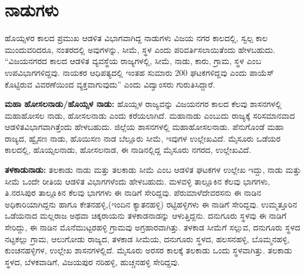 \section{ನಾಡುಗಳು}

ಹೊಯ್ಸಳರ ಕಾಲದ ಪ್ರಮುಖ ಆಡಳಿತ ವಿಭಾಗವಾಗಿದ್ದ ನಾಡುಗಳು ವಿಜಯ ನಗರ ಕಾಲದಲ್ಲಿ, ಸ್ವಲ್ಪ ಕಾಲ ಮುಂದುವರಿದರೂ, ನಂತರದಲ್ಲಿ ಅವುಗಳನ್ನು, ಸೀಮೆ, ಸ್ಥಳ ಎಂದು ಪರಿವರ್ತಿಸಲಾಯಿತೆಂದು ಹೇಳಬಹುದು. “ವಿಜಯನಗರದ ಕಾಲದ ಆಡಳಿತ ವ್ಯವಸ್ಥೆಯ ರಾಜ್ಯಗಳಲ್ಲಿ, ಸೀಮೆ, ನಾಡು, ಕಾರು, ಗ್ರಾಮ, ಸ್ಥಳ ಎಂಬ ಉಪವಿಭಾಗಗಳಿದ್ದವು. ನಾಯಕರ ಆಧಿಪತ್ಯದಲ್ಲಿ ಇಂತಹ ಸುಮಾರು 200 ಘಟಕಗಳಿದ್ದವು ಎಂದು ಪಾಯೆಸ್​ ಕೊಟ್ಟಿರುವ ವಿವರಣೆಯಿಂದ ವ್ಯಕ್ತವಾಗುವುದು” ಎಂದು ವಿದ್ವಾಂಸರು ಗುರುತಿಸಿದ್ದಾರೆ.

\textbf{ಮಹಾ ಹೋಸಲನಾಡು/ಹೊಯ್ಸಳ ನಾಡು:} ಹೊಯ್ಸಳ ರಾಜ್ಯವನ್ನು ವಿಜಯನಗರ ಕಾಲದ ಕೆಲವು ಶಾಸನಗಳಲ್ಲಿ ಮಹಾಹೋಸಲ ನಾಡು, ಹೋಸಲನಾಡು ಎಂದು ಕರೆಯಲಾಗಿದೆ. ಮಹಾನಾಡು ಎಂಬುದು ರಾಜ್ಯಕ್ಕೆ ಸರಿಸಮಾನವಾದ ಆಡಳಿತವಿಭಾಗವಾಗಿತ್ತೆಂದು ಹೇಳಬಹುದು. ಜಿಲ್ಲೆಯ ಶಾಸನಗಳಲ್ಲಿ ಮಹಾಹೋಸಲನಾಡು. ಪೆನುಗೊಂಡೆ ಮಹಾ ರಾಜ್ಯದ, ಹ್ವೈಸಣ ನಾಡು, ಹೊಯಿಸಣ ನಾಡ ಬೆಲ್ಲೂರು ಸೀಮೆ, ಇವುಗಳ ಉಲ್ಲೇಖವಿದೆ. ಮೈಸೂರು ಒಡೆಯರ ಕಾಲದಲ್ಲಿ, ಹೊಯ್ಸಲನಾಡು, ಹೋಸಲನಾಡ, ಈ ನಾಡಿನಲ್ಲಿದ್ದ ಮೈಸೂರು ನಗರದ, ಉಲ್ಲೇಖವಿದೆ.

\textbf{ತಳಕಾಡುನಾಡು:} ತಲಕಾಡು ನಾಡು ಮತ್ತು ತಲಕಾಡು ಸೀಮೆ ಎಂಬ ಆಡಳಿತ ಘಟಕಗಳ ಉಲ್ಲೇಖ ಇದ್ದು, ನಾಡು ಮತ್ತು ಸೀಮೆ ಒಂದೇ ರೀತಿಯ ಆಡಳಿತ ವಿಭಾಗಗಳೆಂದು ಹೇಳಬಹುದು. ಮಳವಳ್ಳಿ ತಾಲ್ಲೂಕಿನ ಕೆಲವು ಭಾಗಗಳು, ತಿ.ನರಸಿಪುರ ತಾಲ್ಲೂಕಿನ ಕೆಲವು ಭಾಗಗಳು ಈ ನಾಡಿಗೆ ಸೇರಿದ್ದವು. ಪೆರುಮಾಳೆದೇವರಸನು ಈ ನಾಡಿನ ಅಧಿಕಾರಿಯಾಗಿದ್ದನು ಹಾಗೂ ಕೇತನಹಳ್ಳಿ,(ಇಂದಿನ ಕ್ಯಾತನಹಳ್ಳಿ) ರಟ್ಟಿಹಳ್ಳಿಗಳು ಈ ನಾಡಿಗೆ ಸೇರಿದ್ದವು. ಉಮ್ಮತ್ತೂರಿನ ಒಡೆಯನಾದ ಮಲ್ಲರಾಜ ಅಥವಾ ಚಿಕ್ಕರಾಯನು ತಳಕಾಡನಾಡನ್ನು ಆಳುತ್ತಿದ್ದನು. ದನುಗೂರು ಸ್ಥಳವು ಈ ನಾಡಿಗೆ ಸೇರಿದ್ದು, ಈ ನಾಡಿನ ಮೊನೆಮುಟ್ಟರಹಳ್ಳಿ ಗ್ರಾಮವು ಅಗ್ರಹಾರವಾಗಿತ್ತು. ತಳಕಾಡ ಸೀಮೆಗೆ ಸಲ್ಲುವ, ದನುಗೂರು ಸ್ಥಳದ ನಟ್ಟಕಲ್ಲು ಗ್ರಾಮ, ಆಲುಗೋಡು ರಾಜ್ಯದ, ತಳಕಾಡ ಸೀಮೆಯ, ದನುಗೂರು ಸ್ಥಳದ, ಹಲಸನಹಳ್ಳಿ, ಬೊಮ್ಮನಹಳ್ಳಿ, ಕುಂಚನಹಳ್ಳಿಗಳ, ಉಲ್ಲೇಖ ಶಾಸನಗಳಲ್ಲಿದೆ. ಮೈಸೂರು ಅರಸರ ಕಾಲಕ್ಕೆ ತಲಕಾಡು ಒಂದು ಸ್ಥಳವಾಗಿತ್ತು. ತಲಕಾಡು ಸ್ಥಳದ, ಬೆಳಕವಾಡಿಗೆ, ವಿಜಯಪುರ ನರಿಹಳ್ಳಿ, ಹುಚ್ಚನಹಳ್ಳಿ ಸೇರಿದ್ದವು.

